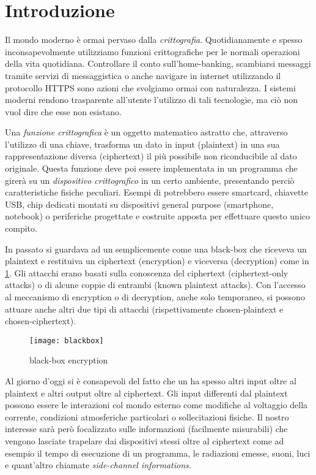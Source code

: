 \chapter*{Introduzione}
	Il mondo moderno è ormai pervaso dalla \emph{crittografia}. Quotidianamente e spesso inconsapevolmente utilizziamo funzioni crittografiche per le normali operazioni della vita quotidiana. Controllare il conto sull'home-banking, scambiarsi messaggi tramite servizi di messaggistica o anche navigare in internet utilizzando il protocollo \acs{HTTPS} sono azioni che svolgiamo ormai con naturalezza. I sistemi moderni rendono trasparente all'utente l'utilizzo di tali tecnologie, ma ciò non vuol dire che esse non esistano.
	
	Una \emph{funzione crittografica} è un oggetto matematico astratto che, attraverso l'utilizzo di una chiave, trasforma un dato in input (plaintext) in una sua rappresentazione diversa (ciphertext) il più possibile non riconducibile al dato originale. Questa funzione deve poi essere implementata in un programma che girerà su un \emph{dispositivo crittografico} in un certo ambiente, presentando perciò caratteristiche fisiche peculiari. Esempi di \dispp potrebbero essere smartcard, chiavette \acs{USB}, chip dedicati montati su dispositivi general purpose (smartphone, notebook) o periferiche progettate e costruite apposta per effettuare questo unico compito.
	
	In passato si guardava ad un \disps semplicemente come una black-box che riceveva un plaintext e restituiva un ciphertext (encryption) e viceversa (decryption) come in \cref{fig:blackbox}. Gli attacchi erano basati sulla conoscenza del ciphertext (ciphertext-only attacks) o di alcune coppie di entrambi (known plaintext attacks). Con l'accesso al meccanismo di encryption o di decryption, anche solo temporaneo, si possono attuare anche altri due tipi di attacchi (rispettivamente chosen-plaintext e chosen-ciphertext)\cite{dispenseCS}.
	
	\begin{figure}
		\begin{center}
			\texttt{[image: blackbox]}
			\caption{black-box encryption}
			\label{fig:blackbox}
		\end{center}
	\end{figure}
	
	Al giorno d'oggi si è consapevoli del fatto che un \disps ha spesso altri input oltre al plaintext e altri output oltre al ciphertext. Gli input differenti dal plaintext possono essere le interazioni col mondo esterno come modifiche al voltaggio della corrente, condizioni atmosferiche particolari o sollecitazioni fisiche. Il nostro interesse sarà però focalizzato sulle informazioni (facilmente misurabili) che vengono lasciate trapelare dai dispositivi stessi oltre al ciphertext come ad esempio il tempo di esecuzione di un programma, le radiazioni emesse, suoni, luci e quant'altro chiamate \emph{side-channel informations}.
	 
